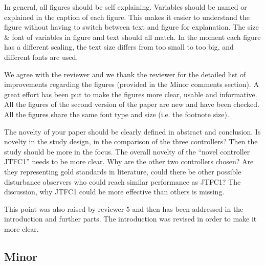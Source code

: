 \begin{point}

In general, all figures should be self explaining. Variables should be
named or explained in the caption of each figure. This makes it easier
to understand the figure without having to switch between text and
figure for explanation. The size \& font of variables in figure and text
should all match. In the moment each figure has a different scaling,
the text size differs from too small to too big, and different fonts
are used.

\end{point}

\begin{reply}
We agree with the reviewer and we thank the reviewer for the detailed list of improvements regarding the figures (provided in the Minor comments section).
A great effort has been put to make the figures more clear, usable and informative.
All the figures of the second version of the paper are new and have been checked.
All the figures share the same font type and size (i.e. the footnote size).
\end{reply}


\begin{point}

The novelty of your paper should be clearly defined in abstract and
conclusion. Is novelty in the study design, in the comparison of the
three controllers? Then the study should be more in the focus. The
overall novelty of the “novel controller JTFC1” needs to be more clear.
Why are the other two controllers chosen? Are they representing gold
standards in literature, could there be other possible disturbance
observers who could reach similar performance as JTFC1? The discussion,
why JTFC1 could be more effective than others is missing.

\end{point}

\begin{reply}
This point was also raised by reviewer 5 and then has been addressed in the introduction and further parts.
The introduction was revised in order to make it more clear.
\end{reply}


\subsection*{Minor}




